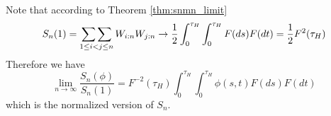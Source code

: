 %
\begin{remark}
	Note that according to Theorem \ref{thm:snmn_limit} 
	\begin{equation*}
		S_n(1) = \mathop{\sum\sum}\limits_{1\leq i<j \leq n} W_{i:n} W_{j:n} \to  \frac{1}{2}\int_{0}^{\tau_H} \int_{0}^{\tau_H} F(ds)F(dt) = \frac{1}{2} F^{2}(\tau_H)
	\end{equation*}
	Therefore we have 
	\begin{equation*}
		\lim\limits_{n\to\infty}\frac{S_n(\phi)}{S_n(1)} = F^{-2}(\tau_H) \int_{0}^{\tau_H} \int_{0}^{\tau_H} \phi(s,t)F(ds)F(dt)
	\end{equation*}
	which is the normalized version of $S_n$.
\end{remark}


